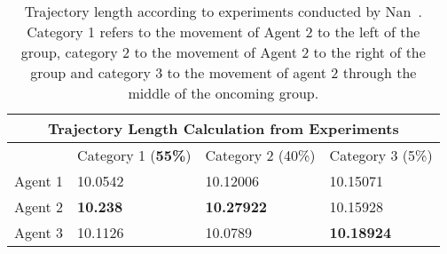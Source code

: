 \begin{table}[!t]

\centering
        \begin{tabular}{p{0.75in}   p{0.75in} p{0.75in} p{0.75in}}
            \hline
            \multicolumn{4}{c}{Trajectory Length Calculation from Experiments}  \\
            \hline
            \multicolumn{1}{c}{} &\multicolumn{1}{c}{Category 1 (\textbf{55\%})} &\multicolumn{1}{c}{Category 2 (40\%)}  &\multicolumn{1}{c}{Category 3 (5\%)} \\
            \hline
            \hline
            \multicolumn{1}{l}{Agent 1} & \multicolumn{1}{l}{10.0542} & \multicolumn{1}{l}{10.12006} & \multicolumn{1}{l}{10.15071}
            \\%
            \multicolumn{1}{l}{Agent 2} & \multicolumn{1}{l}{\textbf{10.238}}& \multicolumn{1}{l}{\textbf{10.27922}}& \multicolumn{1}{l}{10.15928}
            \\%
            \multicolumn{1}{l}{Agent 3} & \multicolumn{1}{l}{10.1126} & \multicolumn{1}{l}{10.0789} & \multicolumn{1}{l}{\textbf{10.18924}}
            \\%

            \hline
            \hline

        \end{tabular}
    \caption[Real world trajectory lengths~\cite{hunanThesis}]{Trajectory length according to experiments conducted by Nan~\cite{hunanThesis}. Category 1 refers to the movement of Agent 2 to the left of the group, category 2 to the movement of Agent 2 to the right of the group and category 3 to the movement of agent 2 through the middle of the oncoming group.}
    \label{tab:RealWorldTrajectoryLengths}
\end{table}

